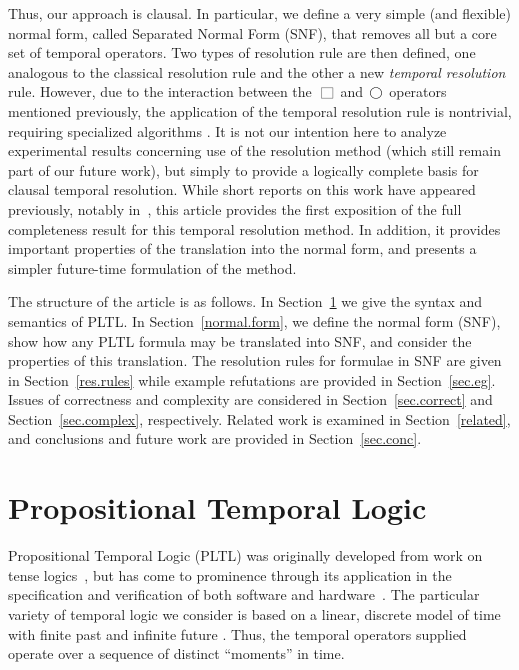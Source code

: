 \documentclass[nohyperref]{acmtrans2f}
\newcommand{\always}{\raisebox{-.2ex}{
                           \mbox{\unitlength=0.9ex
                           \begin{picture}(2,2)
                           \linethickness{0.06ex}
                           \put(0,0){\line(1,0){2}}
                           \put(0,2){\line(1,0){2}}
                           \put(0,0){\line(0,1){2}}
                           \put(2,0){\line(0,1){2}}
                           \end{picture}}}
                          \,}
\newcommand{\next}{\!\raisebox{-.2ex}{ %
                        \mbox{\unitlength=0.9ex
                        \begin{picture}(2,2)
                        \linethickness{0.06ex}
                        \put(1,1){\circle{2}} %
                        \end{picture}}}       %
                        \,}
\begin{document}
Thus, our approach is clausal. In particular, we define a very simple
(and flexible) normal form, called Separated Normal Form (SNF), that
removes all but a core set of temporal operators. Two types of
resolution rule are then defined, one analogous to the classical
resolution rule and the other a new {\em temporal resolution\/} rule.
However, due to the interaction between the $\always$ and $\next$
operators mentioned previously, the application of the temporal
resolution rule is nontrivial, requiring specialized algorithms
\cite{Dix96-CADE}. It is not our intention here to analyze
experimental results concerning use of the resolution method (which
still remain part of our future work), but simply to provide a
logically complete basis for clausal temporal resolution. While short
reports on this work have appeared previously, notably
in~, this article provides the first exposition of
the full completeness result for this temporal resolution method. In
addition, it provides important properties of the translation into the
normal form, and presents a simpler future-time formulation of the
method.

The structure of the article is as follows. In Section~\ref{PLTL} we give the
syntax and semantics of PLTL. In Section~\ref{normal.form}, we define the
normal form (SNF), show how any PLTL formula may be translated into
SNF, and consider the properties of this translation. The resolution
rules for formulae in SNF are given in Section~\ref{res.rules} while example
refutations are provided in Section~\ref{sec.eg}. Issues of correctness and
complexity are considered in Section~\ref{sec.correct} and
Section~\ref{sec.complex}, respectively. Related work is examined in
Section~\ref{related}, and conclusions and future work are provided in
Section~\ref{sec.conc}.
%
%
\section{Propositional Temporal Logic}
\label{PLTL}
%
Propositional Temporal Logic (PLTL) was originally developed from work
on tense logics~\cite{Pri67}, but has come to prominence through its
application in the specification and verification of both software and
hardware~\cite{Pnu77}. The particular variety of temporal logic we
consider is based on a linear, discrete model of time with finite past
and infinite future \cite{GPSS80,LPZ85}. Thus, the temporal operators
supplied operate over a sequence of distinct ``moments'' in time.
\end{document}
